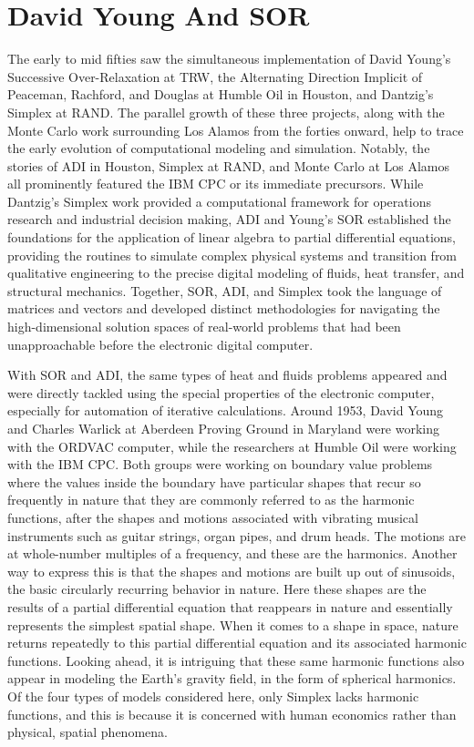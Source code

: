 \chapter{David Young And SOR}

The early to mid fifties saw the simultaneous implementation of David Young’s Successive Over-Relaxation at TRW, the Alternating Direction Implicit of Peaceman, Rachford, and Douglas at Humble Oil in Houston, and Dantzig’s Simplex at RAND. The parallel growth of these three projects, along with the Monte Carlo work surrounding Los Alamos from the forties onward, help to trace the early evolution of computational modeling and simulation. Notably, the stories of ADI in Houston, Simplex at RAND, and Monte Carlo at Los Alamos all prominently featured the IBM CPC or its immediate precursors. While Dantzig’s Simplex work provided a computational framework for operations research and industrial decision making, ADI and Young’s SOR established the foundations for the application of linear algebra to partial differential equations, providing the routines to simulate complex physical systems and transition from qualitative engineering to the precise digital modeling of fluids, heat transfer, and structural mechanics. Together, SOR, ADI, and Simplex took the language of matrices and vectors and developed distinct methodologies for navigating the high-dimensional solution spaces of real-world problems that had been unapproachable before the electronic digital computer. \cite{metropolisMonteCarloMethod1949} \cite{orchard-haysEvolutionLinearProgramming1958}

With SOR and ADI, the same types of heat and fluids problems appeared and were directly tackled using the special properties of the electronic computer, especially for automation of iterative calculations. Around 1953, David Young and Charles Warlick at Aberdeen Proving Ground in Maryland were working with the ORDVAC computer, while the researchers at Humble Oil were working with the IBM CPC. Both groups were working on boundary value problems where the values inside the boundary have particular shapes that recur so frequently in nature that they are commonly referred to as the harmonic functions, after the shapes and motions associated with vibrating musical instruments such as guitar strings, organ pipes, and drum heads. The motions are at whole-number multiples of a frequency, and these are the harmonics. Another way to express this is that the shapes and motions are built up out of sinusoids, the basic circularly recurring behavior in nature. Here these shapes are the results of a partial differential equation that reappears in nature and essentially represents the simplest spatial shape. When it comes to a shape in space, nature returns repeatedly to this partial differential equation and its associated harmonic functions. Looking ahead, it is intriguing that these same harmonic functions also appear in modeling the Earth's gravity field, in the form of spherical harmonics. Of the four types of models considered here, only Simplex lacks harmonic functions, and this is because it is concerned with human economics rather than physical, spatial phenomena. \cite{youngIterativeMethodsSolving1954} \cite{peacemanNumericalSolutionParabolic1955a}

